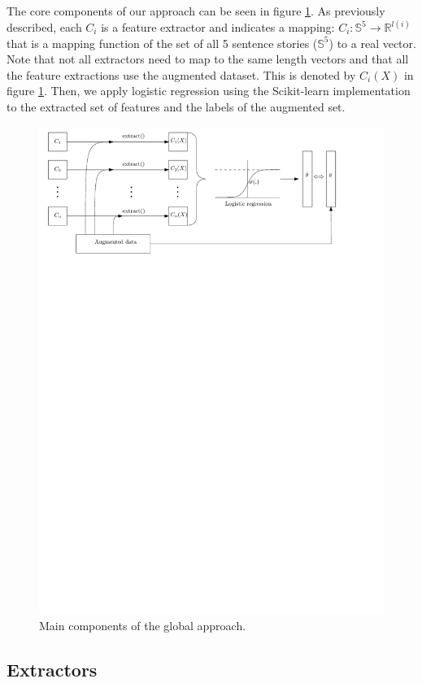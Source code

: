 \documentclass{article}
\begin{document}
The core components of our approach can be seen in figure \ref*{Main}. As
previously described, each $C_i$ is a feature extractor and indicates a mapping:
 $C_i: \mathbb{S}^5 \rightarrow \mathbb{R}^{l(i)}$ that is a mapping function of
 the set of all 5 sentence stories ($\mathbb{S}^5$) to a real vector. Note that 
 not all extractors need to map to the same length vectors and that all the feature
 extractions use the augmented dataset. This is
denoted by $C_i(X)$ in figure \ref*{Main}. Then, we apply logistic regression
using the Scikit-learn implementation to the extracted set of
features and the labels of the augmented set.
\begin{figure}
	\centering
	\includegraphics[scale=0.6]{fig/logistic_fitting.pdf}
	\caption{Main components of the global approach.}
	\label{Main}
\end{figure}
\subsection{Extractors}
\end{document}
